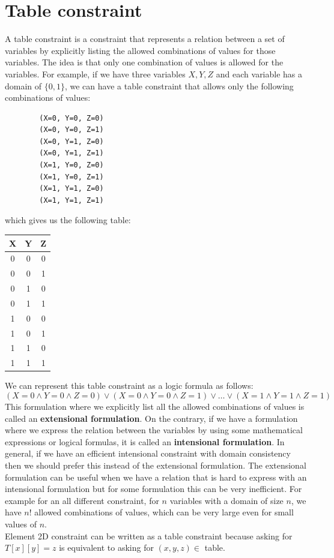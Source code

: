 \documentclass[12pt, openany]{report}
\theoremstyle{definition}
\begin{document}
\section{Table constraint}
A table constraint is a constraint that represents a relation between a set of variables by explicitly listing the allowed combinations of values for those variables. The idea is that only one combination of values is allowed for the variables. For example, if we have three variables $X, Y, Z$ and each variable has a domain of $\{0,1\}$, we can have a table constraint that allows only the following combinations of values:
\begin{center}
    \begin{lstlisting}    
        (X=0, Y=0, Z=0)
        (X=0, Y=0, Z=1)
        (X=0, Y=1, Z=0)
        (X=0, Y=1, Z=1)
        (X=1, Y=0, Z=0)
        (X=1, Y=0, Z=1)
        (X=1, Y=1, Z=0)
        (X=1, Y=1, Z=1)
    \end{lstlisting}
\end{center}
which gives us the following table:
\begin{center}
    \begin{tabular}{c|c|c}
    X & Y & Z \\
    \hline
    0 & 0 & 0 \\
    0 & 0 & 1 \\
    0 & 1 & 0 \\
    0 & 1 & 1 \\
    1 & 0 & 0 \\
    1 & 0 & 1 \\
    1 & 1 & 0 \\
    1 & 1 & 1 \\
    \end{tabular}
\end{center}
We can represent this table constraint as a logic formula as follows:
\begin{equation}
    (X=0 \land Y=0 \land Z=0) \lor (X=0 \land Y=0 \land Z=1) \lor \dots \lor (X=1 \land Y=1 \land Z=1)
\end{equation}
This formulation where we explicitly list all the allowed combinations of values is called an \textbf{extensional formulation}. On the contrary, if we have a formulation where we express the relation between the variables by using some mathematical expressions or logical formulas, it is called an \textbf{intensional formulation}. In general, if we have an efficient intensional constraint with domain consistency then we should prefer this instead of the extensional formulation. The extensional formulation can be useful when we have a relation that is hard to express with an intensional formulation but for some formulation this can be very inefficient. For example for an all different constraint, for $n$ variables with a domain of size $n$, we have $n!$ allowed combinations of values, which can be very large even for small values of $n$.\\
Element 2D constraint can be written as a table constraint because asking for $T[x][y] = z$ is equivalent to asking for $(x,y,z) \in$ table. 
\end{document}
